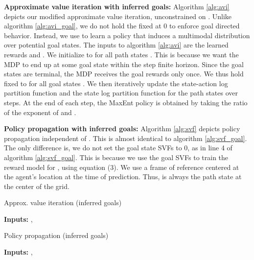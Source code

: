 \documentclass[journal]{IEEEtran}
\begin{document}
\noindent\textbf{Approximate value iteration with inferred goals:}
Algorithm \ref{alg:avi} depicts our modified approximate value iteration, unconstrained on . Unlike algorithm \ref{alg:avi_goal}, we do not hold the  fixed at 0 to enforce goal directed behavior. Instead, we use  to learn a policy that induces a multimodal distribution over potential goal states. The inputs to algorithm \ref{alg:avi} are the learned rewards  and . We initialize  to  for all path states . This is because we want the MDP to end up at some goal state within the  step finite horizon. Since the goal states are terminal, the MDP receives the goal rewards only once. We thus hold  fixed to  for all goal states . We then iteratively update the state-action log partition function  and the state log partition function  for the path states  over  steps. At the end of each step, the MaxEnt policy is obtained by taking the ratio of the exponent of  and .

\vspace{0.1in}
\noindent\textbf{Policy propagation with inferred goals:} Algorithm \ref{alg:svf} depicts policy propagation independent of . This is almost identical to algorithm \ref{alg:svf_goal}. The only difference is, we do not set the goal state SVFs to 0, as in line 4 of algorithm \ref{alg:svf_goal}. This is because we use the goal SVFs to train the reward model for , using equation (3). We use a frame of reference centered at the agent's location at the time of prediction. Thus,  is always the path state at the center of the grid.  









{\centering
\begin{minipage}{\linewidth}
\begin{algorithm}[H]
  \caption{Approx. value iteration (inferred goals)}\label{alg:avi}
  \hspace*{\algorithmicindent}\textbf{Inputs:} ,  
  \begin{algorithmic}[1]
  \State                
  \For{}
    \State 
    \State 
    \State   
    \State 
  \EndFor

    
  \end{algorithmic}
\end{algorithm}
\end{minipage}
\par
}


{\centering
\begin{minipage}{\linewidth}
\begin{algorithm}[H]
  \caption{Policy propagation (inferred goals)}\label{alg:svf}
  \hspace*{\algorithmicindent}\textbf{Inputs:} , 
  \begin{algorithmic}[1]
  \State  
  \State                
  \For{}
    \State 
  \EndFor
  \State 
    
  \end{algorithmic}
\end{algorithm}
\end{minipage}
\par
}
\end{document}
